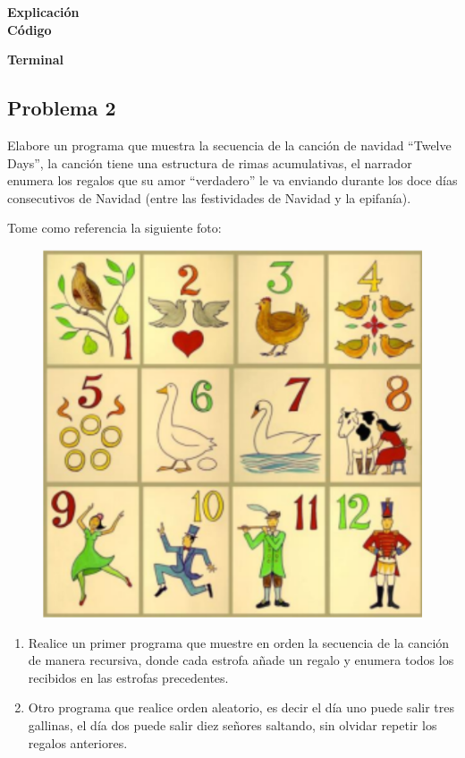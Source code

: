 \documentclass[11pt, twocolumn]{article}
\begin{document}
  \textbf{Explicación} \\


  \textbf{Código}


  \textbf{Terminal}


  \subsection*{Problema 2}
  Elabore un programa que muestra la secuencia de la canción de navidad ``Twelve Days'', la canción tiene una estructura de rimas acumulativas, el narrador enumera los regalos que su amor ``verdadero'' le va enviando durante los doce días consecutivos de Navidad (entre las festividades de Navidad y la epifanía).

  Tome como referencia la siguiente foto:
  \begin{figure}[ht]
    \includegraphics[width=0.6\columnwidth, center]{Cancion.png}
  \end{figure}

  \begin{enumerate}[label=\alph*)]
    \item Realice un primer programa que muestre en orden la secuencia de la canción de manera recursiva, donde cada estrofa añade un regalo y enumera todos los recibidos en las estrofas precedentes.
    \item Otro programa que realice orden aleatorio, es decir el día uno puede salir tres gallinas, el día dos puede salir diez señores saltando, sin olvidar repetir los regalos anteriores.
  \end{enumerate}
\end{document}
